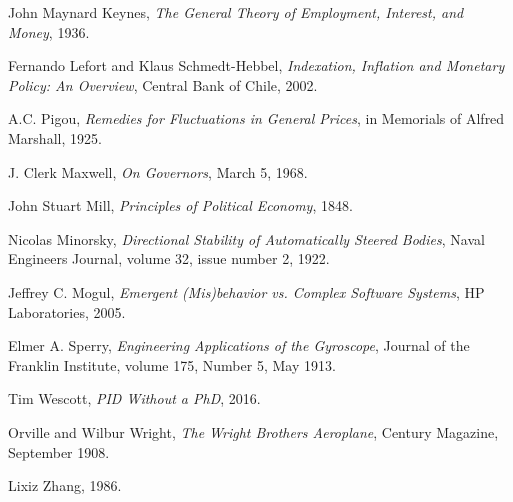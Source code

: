 \begin{thebibliography}{9}
    John Maynard Keynes,
    \emph{The General Theory of Employment, Interest, and Money},
    1936.

    Fernando Lefort and Klaus Schmedt-Hebbel,
    \emph{Indexation, Inflation and Monetary Policy: An Overview},
    Central Bank of Chile,
    2002.

    A.C. Pigou,
    \emph{Remedies for Fluctuations in General Prices},
    in Memorials of Alfred Marshall,
    1925.

    J. Clerk Maxwell,
    \emph{On Governors},
    March 5, 1968.

    John Stuart Mill,
    \emph{Principles of Political Economy},
    1848.

    Nicolas Minorsky,
    \emph{Directional Stability of Automatically Steered Bodies},
    Naval Engineers Journal,
    volume 32,
    issue number 2,
    1922.

    Jeffrey C. Mogul,
    \emph{Emergent (Mis)behavior vs. Complex Software Systems},
    HP Laboratories,
    2005.

    Elmer A. Sperry,
    \emph{Engineering Applications of the Gyroscope},
    Journal of the Franklin Institute,
    volume 175,
    Number 5,
    May 1913.

    Tim Wescott,
    \emph{PID Without a PhD},
    2016.

    Orville and Wilbur Wright,
    \emph{The Wright Brothers Aeroplane},
    Century Magazine,
    September 1908.

    Lixiz Zhang,
    1986.

\end{thebibliography}

